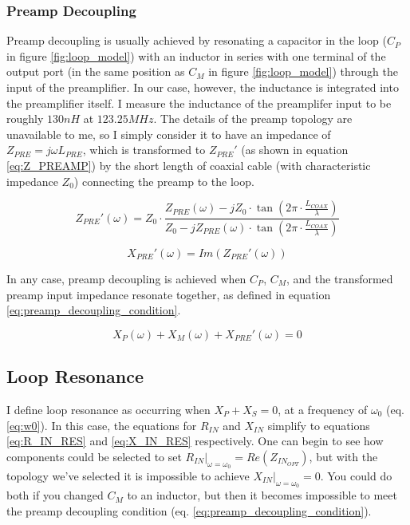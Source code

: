 \subsubsection{Preamp Decoupling}
Preamp decoupling is usually achieved by resonating a capacitor in the loop ($C_P$ in figure \ref{fig:loop_model}) with
an inductor in series with one terminal of the output port (in the same position as $C_M$ in figure
\ref{fig:loop_model}) through the input of the preamplifier. In our case, however, the inductance is integrated into the
preamplifier itself. I measure the inductance of the preamplifer input to be roughly $130nH$ at $123.25 MHz$. The
details of the preamp topology are unavailable to me, so I simply consider it to have an impedance of $Z_{PRE}=j\omega
L_{PRE}$, which is transformed to ${Z_{PRE}}'$ (as shown in equation \ref{eq:Z_PREAMP}) by the short length of coaxial
cable (with characteristic impedance $Z_0$) connecting the preamp to the loop.

\begin{equation} \label{eq:Z_PREAMP}
    {Z_{PRE}}'(\omega)=Z_0 \cdot \frac{Z_{PRE}(\omega)-j Z_0 \cdot \tan(2\pi\cdot\frac{L_{COAX}}{\lambda})}{Z_0 - j
    Z_{PRE}(\omega) \cdot \tan(2\pi\cdot\frac{L_{COAX}}{\lambda})}
\end{equation}

\begin{equation} \label{eq:X_PREAMP}
    {X_{PRE}}'(\omega)=Im({Z_{PRE}}'(\omega))
\end{equation}
    
In any case, preamp decoupling is achieved when $C_P$, $C_M$, and the transformed preamp input impedance resonate
together, as defined in equation \ref{eq:preamp_decoupling_condition}.

\begin{equation} \label{eq:preamp_decoupling_condition}
    X_P(\omega) + X_M(\omega) +{X_{PRE}}'(\omega) = 0
\end{equation}

\subsection{Loop Resonance}
I define loop resonance as occurring when $X_P + X_S = 0$, at a frequency of $\omega_0$ (eq. \ref{eq:w0}). In this case,
the equations for $R_{IN}$ and $X_{IN}$ simplify to equations \ref{eq:R_IN_RES} and \ref{eq:X_IN_RES} respectively. One
can begin to see how components could be selected to set $R_{IN}\big|_{\omega=\omega_0}=Re(Z_{IN_{OPT}})$, but with the
topology we've selected it is impossible to achieve $X_{IN}\big|_{\omega=\omega_0}=0$. You could do both if you changed
$C_M$ to an inductor, but then it becomes impossible to meet the preamp decoupling condition (eq.
\ref{eq:preamp_decoupling_condition}).


